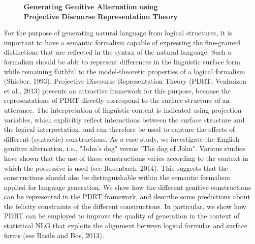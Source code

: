 \documentclass[10pt, a4paper, twopage, headinclude, footinclude, BCOR5mm]{book}
\begin{document}
\newpage

\begin{figure}[t!]
\centering
\large\textbf{Generating Genitive Alternation using \\ Projective Discourse Representation Theory}
\vspace*{0.5cm}
\end{figure}


\begin{table}[t!]
\end{table} 
\noindent
For the purpose of generating natural language from logical structures, it is important to have a semantic formalism capable of expressing the fine-grained distinctions that are reflected in the syntax of the natural language. Such a formalism should be able to represent differences in the linguistic surface form while remaining faithful to the model-theoretic properties of a logical formalism (Shieber, 1993).  Projective Discourse Representation Theory (PDRT; Venhuizen et al., 2013) presents an attractive framework for this purpose, because the representations of PDRT directly correspond to the surface structure of an utterance. The interpretation of linguistic content is indicated using projection variables, which explicitly reflect interactions between the surface structure and the logical interpretation, and can therefore be used to capture the effects of different (syntactic) constructions.  As a case study, we investigate the English genitive alternation, i.e., "John's dog" versus "The dog of John". Various studies have shown that the use of these constructions varies according to the context in which the possessive is used (see Rosenbach, 2014). This suggests that the constructions should also be distinguishable within the semantic formalism applied for language generation.  We show how the different genitive constructions can be represented in the PDRT framework, and describe some predictions about the felicity constraints of the different constructions. In particular, we show how PDRT can be employed to improve the quality of generation in the context of statistical NLG that exploits the alignment between logical formulas and surface forms (see Basile and Bos, 2013).  
\end{document}
